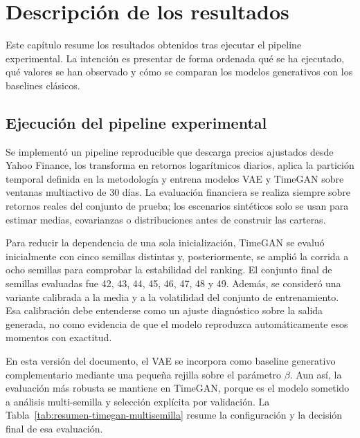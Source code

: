 \documentclass[11pt,a4paper,spanish,oneside]{book}
\numberwithin{equation}{chapter}
\numberwithin{figure}{chapter}
\begin{document}
\section{Descripción de los resultados}

Este capítulo resume los resultados obtenidos tras ejecutar el pipeline experimental. La intención es presentar de forma ordenada qué se ha ejecutado, qué valores se han observado y cómo se comparan los modelos generativos con los baselines clásicos.

\subsection{Ejecución del pipeline experimental}

Se implementó un pipeline reproducible que descarga precios ajustados desde Yahoo Finance, los transforma en retornos logarítmicos diarios, aplica la partición temporal definida en la metodología y entrena modelos VAE y TimeGAN sobre ventanas multiactivo de 30 días. La evaluación financiera se realiza siempre sobre retornos reales del conjunto de prueba; los escenarios sintéticos solo se usan para estimar medias, covarianzas o distribuciones antes de construir las carteras.

Para reducir la dependencia de una sola inicialización, TimeGAN se evaluó inicialmente con cinco semillas distintas y, posteriormente, se amplió la corrida a ocho semillas para comprobar la estabilidad del ranking. El conjunto final de semillas evaluadas fue 42, 43, 44, 45, 46, 47, 48 y 49. Además, se consideró una variante calibrada a la media y a la volatilidad del conjunto de entrenamiento. Esa calibración debe entenderse como un ajuste diagnóstico sobre la salida generada, no como evidencia de que el modelo reproduzca automáticamente esos momentos con exactitud.

En esta versión del documento, el VAE se incorpora como baseline generativo complementario mediante una pequeña rejilla sobre el parámetro $\beta$. Aun así, la evaluación más robusta se mantiene en TimeGAN, porque es el modelo sometido a análisis multi-semilla y selección explícita por validación. La Tabla~\ref{tab:resumen-timegan-multisemilla} resume la configuración y la decisión final de esa evaluación.
\end{document}
